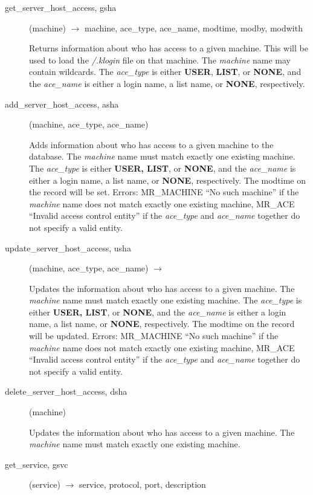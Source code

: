 \begin{description}

\item[get\_server\_host\_access, gsha](machine) $\rightarrow$ machine,
ace\_type, ace\_name, modtime, modby, modwith

Returns information about who has access to a given machine.  This
will be used to load the {\em /.klogin} file on that machine.  The
{\em machine} name may contain wildcards.  The {\em ace\_type} is either
{\bf USER}, {\bf LIST}, or {\bf NONE}, and the {\em ace\_name} is either a
login name, a list name, or {\bf NONE}, respectively.

\item[add\_server\_host\_access, asha](machine, ace\_type, ace\_name)

Adds information about who has access to a given machine to the
database.  The {\em machine} name must match exactly one existing
machine.  The {\em ace\_type} is either {\bf USER, LIST}, or {\bf NONE}, and
the {\em ace\_name} is either a login name, a list name, or {\bf NONE},
respectively.  The modtime on the record will be set.  Errors:
MR\_MACHINE ``No such machine'' if the {\em machine} name does not match
exactly one existing machine, MR\_ACE ``Invalid access control entity''
if the {\em ace\_type} and {\em ace\_name} together do not specify a valid
entity.

\item[update\_server\_host\_access, usha](machine, ace\_type, ace\_name)
$\rightarrow$

Updates the information about who has access to a given machine.  The
{\em machine} name must match exactly one existing machine.  The
{\em ace\_type} is either {\bf USER, LIST}, or {\bf NONE}, and the
{\em ace\_name} is either a login name, a list name, or {\bf NONE},
respectively.  The modtime on the record will be updated.  Errors:
MR\_MACHINE ``No such machine'' if the {\em machine} name does not match
exactly one existing machine, MR\_ACE ``Invalid access control entity''
if the {\em ace\_type} and {\em ace\_name} together do not specify a valid
entity.

\item[delete\_server\_host\_access, dsha](machine)

Updates the information about who has access to a given machine.  The
{\em machine} name must match exactly one existing machine.

\item[get\_service, gsvc](service) $\rightarrow$ service, protocol, port, description


\end{description}
